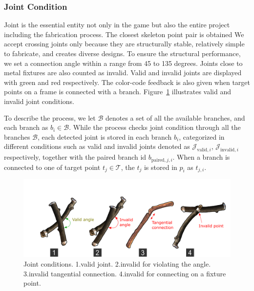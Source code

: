 \subsubsection*{Joint Condition}
Joint is the essential entity not only in the game but also the entire project including the fabrication process.
The closest skeleton point pair is obtained
We accept crossing joints only because they are structurally stable, relatively simple to fabricate, and creates diverse designs.
To ensure the structural performance, we set a connection angle within a range from 45 to 135 degrees.
Joints close to metal fixtures are also counted as invalid.
Valid and invalid joints are displayed with green and red respectively.
The color-code feedback is also given when target points on a frame is connected with a branch.
Figure~\ref{fig:joint_condition} illustrates valid and invalid joint conditions.


To describe the process, we let $\mathcal{B}$ denotes a set of all the available branches, and each branch as $ b_i \in \mathcal{B}$.
While the process checks joint condition through all the branches $\mathcal{B}$, each detected joint is stored in each branch $b_i$, categorized in different conditions such as valid and invalid joints denoted as
$\mathcal{J}_{\text{valid},i}$,
$\mathcal{J}_{\text{invalid},i}$ respectively, together with the paired branch id $b_{\text{paired},j, i}$.
When a branch is connected to one of target point $t_j \in \mathcal{T} $, the $t_j$ is stored in $p_i$ as $t_{j,i}$.


\begin{figure}[ht]
  \begin{center}
    \includegraphics[width = 0.4\paperwidth]{images/system/joint_conditions_2.png}
    \caption{Joint conditions. 1.valid joint. 2.invalid for violating the angle. 3.invalid tangential connection. 4.invalid for connecting on a fixture point. }
    \label{fig:joint_condition}
  \end{center}
\end{figure}

